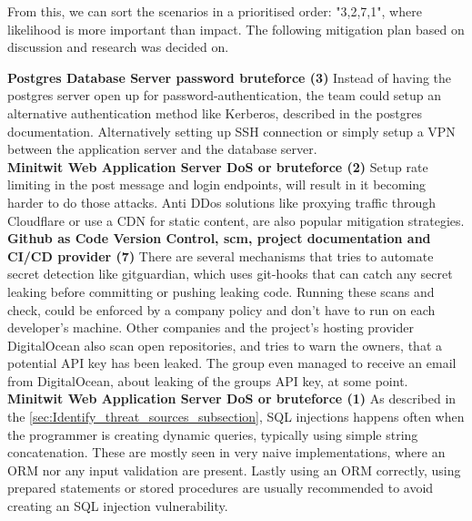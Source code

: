 From this, we can sort the scenarios in a prioritised order: "3,2,7,1", where likelihood is more important than impact. The following mitigation plan based on discussion and research was decided on. 

\textbf{Postgres Database Server password bruteforce (3)}
Instead of having the postgres server open up for password-authentication, the team could setup an alternative authentication method like Kerberos, described in the postgres documentation\cite{postgres_auth_methods}.
Alternatively setting up SSH connection or simply setup a VPN between the application server and the database server.\\

\textbf{Minitwit Web Application Server DoS or bruteforce (2)}
Setup rate limiting in the post message and login endpoints, will result in it becoming harder to do those attacks. Anti DDos solutions like proxying traffic through Cloudflare or use a CDN for static content, are also popular mitigation strategies.\cite{owasp_dos_mitigation }\\

\textbf{Github as Code Version Control, \acrshort{scm}, project documentation and CI/CD provider (7)}
There are several mechanisms that tries to automate secret detection like gitguardian\cite{gitguardian}, which uses git-hooks that can catch any secret leaking before committing or pushing leaking code. Running these scans and check, could be enforced by a company policy and don't have to run on each developer's machine. Other companies and the project's hosting provider DigitalOcean also scan open repositories, and tries to warn the owners, that a potential API key has been leaked.\cite{github_do_scanning_partner} The group even managed to receive an email from DigitalOcean, about leaking of the groups API key, at some point.\\

\textbf{Minitwit Web Application Server DoS or bruteforce (1)}
As described in the \autoref{sec:Identify_threat_sources_subsection}, SQL injections happens often when the programmer is creating dynamic queries, typically using simple string concatenation. These are mostly seen in very naive implementations, where an ORM nor any input validation are present. Lastly using an ORM correctly, using prepared statements or stored procedures are usually recommended to avoid creating an SQL injection vulnerability.